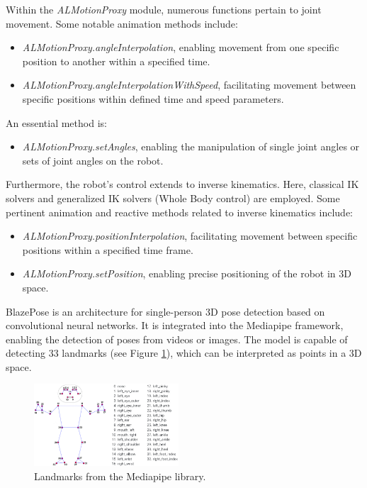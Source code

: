 \documentclass[conference]{IEEEtran}
\begin{document}
Within the \textit{ALMotionProxy} module, numerous functions pertain to joint movement. Some notable animation methods include:
\begin{itemize}
    \item \textit{ALMotionProxy.angleInterpolation}, enabling movement from one specific position to another within a specified time.
    \item \textit{ALMotionProxy.angleInterpolationWithSpeed}, facilitating movement between specific positions within defined time and speed parameters.
\end{itemize}
An essential method is:
\begin{itemize}
\item \textit{ALMotionProxy.setAngles}, enabling the manipulation of single joint angles or sets of joint angles on the robot.
\end{itemize}

Furthermore, the robot's control extends to inverse kinematics. Here, classical IK solvers and generalized IK solvers (Whole Body control) are employed. Some pertinent animation and reactive methods related to inverse kinematics include:
\begin{itemize}
    \item \textit{ALMotionProxy.positionInterpolation}, facilitating movement between specific positions within a specified time frame.
    \item \textit{ALMotionProxy.setPosition}, enabling precise positioning of the robot in 3D space.
\end{itemize}

BlazePose \cite{b2} is an architecture for single-person 3D pose detection based on convolutional neural networks. It is integrated into the Mediapipe framework, enabling the detection of poses from videos or images. The model is capable of detecting 33 landmarks (see Figure \ref{fig:landmarksMP}), which can be interpreted as points in a 3D space.

\begin{figure}[htbp]
    \label{fig:landmarksMP}
    \centerline{\includegraphics[width=0.48\textwidth]{images/landmarksMP.jpeg}}
    \caption{Landmarks from the Mediapipe library.}
\end{figure}
\end{document}
